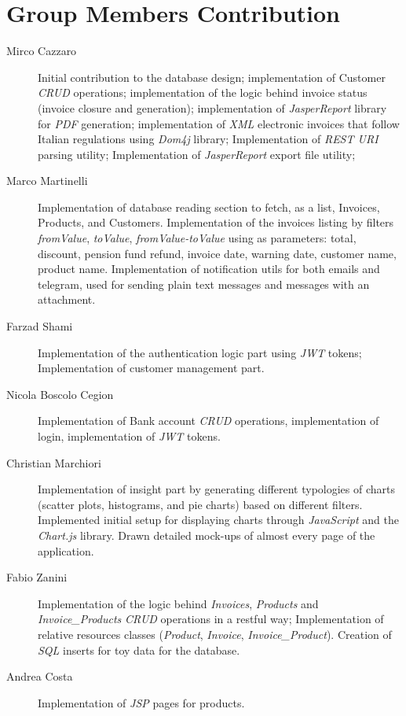 \newpage
\section{Group Members Contribution}


\begin{description}
	\item[Mirco Cazzaro] Initial contribution to the database design; implementation of Customer \textit{CRUD} operations; implementation of the logic behind invoice status (invoice closure and generation); implementation of \textit{JasperReport} library for \textit{PDF} generation; implementation of \textit{XML} electronic invoices that follow Italian regulations using \textit{Dom4j} library; Implementation of \textit{REST URI} parsing utility; Implementation of \textit{JasperReport} export file utility;
	\item[Marco Martinelli] Implementation of database reading section to fetch, as a list, Invoices, Products, and Customers. 
    Implementation of the invoices listing by filters \textit{fromValue}, \textit{toValue}, \textit{fromValue-toValue} using as parameters: total, discount, pension fund refund, invoice date, warning date, customer name, product name.
    Implementation of notification utils for both emails and telegram, used for sending plain text messages and messages with an attachment.  
	\item[Farzad Shami] Implementation of the authentication logic part using \textit{JWT} tokens; Implementation of customer management part.
	\item[Nicola Boscolo Cegion] Implementation of Bank account \textit{CRUD} operations, implementation of login, implementation of \textit{JWT} tokens.
	\item[Christian Marchiori] Implementation of insight part by generating different typologies of charts (scatter plots, histograms, and pie charts) based on different filters. Implemented initial setup for displaying charts through \textit{JavaScript} and the \textit{Chart.js} library. Drawn detailed mock-ups of almost every page of the application.
	\item[Fabio Zanini] Implementation of the logic behind \textit{Invoices}, \textit{Products} and \textit{Invoice\_Products} \textit{CRUD} operations in a restful way; Implementation of relative resources classes (\textit{Product}, \textit{Invoice}, \textit{Invoice\_Product}). Creation of \textit{SQL} inserts for toy data for the database.
	\item[Andrea Costa] Implementation of \textit{JSP} pages for products.
\end{description}
